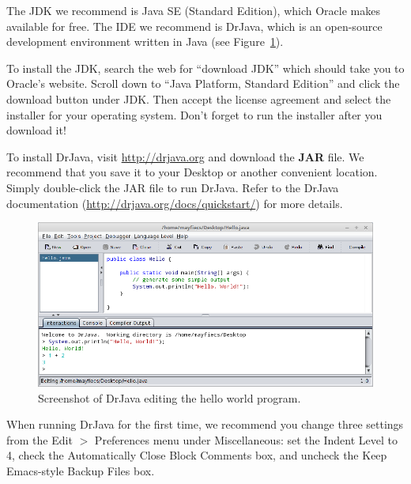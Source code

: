 \documentclass[12pt]{book}
\theoremstyle{exercise}
\begin{document}
The JDK we recommend is Java SE (Standard Edition), which Oracle makes available for free.
The IDE we recommend is DrJava, which is an open-source development environment written in Java (see Figure~\ref{fig.drjava1}).

To install the JDK, search the web for ``download JDK'' which should take you to Oracle's website.
Scroll down to ``Java Platform, Standard Edition'' and click the download button under JDK.
Then accept the license agreement and select the installer for your operating system.
Don't forget to run the installer after you download it!


To install DrJava, visit \url{http://drjava.org} and download the {\bf JAR} file.
We recommend that you save it to your Desktop or another convenient location.
Simply double-click the JAR file to run DrJava.
Refer to the DrJava documentation (\url{http://drjava.org/docs/quickstart/}) for more details.

\begin{figure}[!ht]
\begin{center}
\includegraphics[width=\textwidth]{figs/drjava-hello.png}
\caption{Screenshot of DrJava editing the hello world program.}
\label{fig.drjava1}
\end{center}
\end{figure}

When running DrJava for the first time, we recommend you change three settings from the {\sf Edit $>$ Preferences} menu under {\sf Miscellaneous}: set the {\sf Indent Level} to 4, check the {\sf Automatically Close Block Comments} box, and uncheck the {\sf Keep Emacs-style Backup Files} box.


\end{document}
